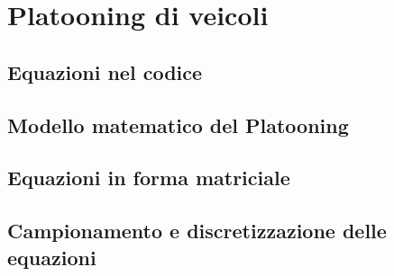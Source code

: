 \section{Platooning di veicoli}
\fancyhead{}

\subsection{Equazioni nel codice}

\subsection{Modello matematico del Platooning}

\subsection{Equazioni in forma matriciale}

\subsection{Campionamento e discretizzazione delle equazioni}